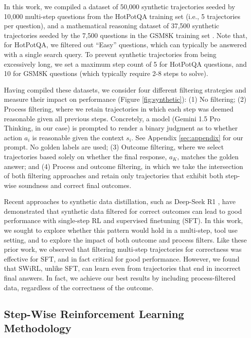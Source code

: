 \documentclass{article} %
\begin{document}
In this work, we compiled a dataset of 50,000 synthetic trajectories seeded by 10,000 multi-step questions from the HotPotQA training set \citep{yang2018hotpotqadatasetdiverseexplainable} (i.e., 5 trajectories per question), and a mathematical reasoning dataset of 37,500 synthetic trajectories seeded by the 7,500 questions in the GSM8K training set \citep{gsm8k2021}. Note that, for HotPotQA, we filtered out ``Easy'' questions, which can typically be answered with a single search query. To prevent synthetic trajectories from being excessively long, we set a maximum step count of 5 for HotPotQA questions, and 10 for GSM8K questions (which typically require 2-8 steps to solve).

Having compiled these datasets, we consider four different filtering strategies and measure their impact on performance (Figure \ref{fig:synthetic}): (1) No filtering; (2) Process filtering, where we retain trajectories in which each step was deemed reasonable given all previous steps. Concretely, a model (Gemini 1.5 Pro Thinking, in our case) is prompted to render a binary judgment as to whether action $a_i$ is reasonable given the context $s_{i}$. See Appendix \ref{sec:appendix} for our prompt. No golden labels are used; (3) Outcome filtering, where we select trajectories based solely on whether the final response, $a_K$, matches the golden answer; and (4) Process and outcome filtering, in which we take the intersection of both filtering approaches and retain only trajectories that exhibit both step-wise soundness and correct final outcomes.

Recent approaches to synthetic data distillation, such as Deep-Seek R1 \citep{deepseekr1}, have demonstrated that synthetic data filtered for correct outcomes can lead to good performance with single-step RL and supervised finetuning (SFT). In this work, we sought to explore whether this pattern would hold in a multi-step, tool use setting, and to explore the impact of both outcome and process filters. Like these prior work, we observed that filtering multi-step trajectories for correctness was effective for SFT, and in fact critical for good performance. However, we found that SWiRL, unlike SFT, can learn even from trajectories that end in incorrect final answers. In fact, we achieve our best results by including process-filtered data, regardless of the correctness of the outcome.

\subsection{Step-Wise Reinforcement Learning Methodology}
\end{document}
